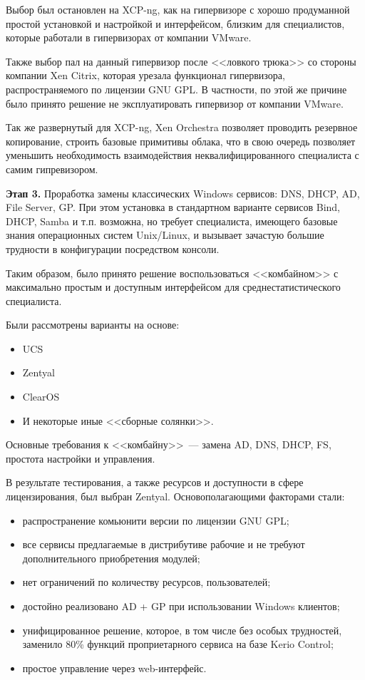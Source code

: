 \documentclass[10pt, a5paper]{article}
\begin{document}
Выбор был остановлен на XCP-ng, как на гипервизоре с хорошо продуманной простой установкой и настройкой и интерфейсом, близким для специалистов, которые работали в гипервизорах от компании VMware.

Также выбор пал на данный гипервизор после <<ловкого трюка>> со стороны компании Xen Citrix, которая урезала функционал гипервизора, распространяемого по лицензии GNU GPL. В частности, по этой же причине было принято решение не эксплуатировать гипервизор от компании VMware.

Так же развернутый для XCP-ng, Xen Orchestra позволяет проводить резервное копирование, строить базовые примитивы облака, что в свою очередь позволяет уменьшить необходимость взаимодействия неквалифицированного специалиста с самим гипревизором.

\textbf{Этап 3.} Проработка замены классических Windows сервисов:
DNS, DHCP, AD, File Server, GP. При этом установка в стандартном варианте сервисов Bind, DHCP, Samba и т.п. возможна, но требует специалиста, имеющего базовые знания операционных систем Unix/Linux, и вызывает зачастую большие трудности в конфигурации посредством консоли.

Таким образом, было принято решение воспользоваться <<комбайном>> с максимально простым и доступным интерфейсом для среднестатистического специалиста.

Были рассмотрены варианты на основе:

\begin{itemize}
  \item UCS
  \item Zentyal
  \item ClearOS
  \item И некоторые иные <<сборные солянки>>.
\end{itemize}

Основные требования к <<комбайну>>~--- замена AD, DNS, DHCP, FS, простота настройки и управления.

В результате тестирования, а также ресурсов и доступности в сфере лицензирования, был выбран Zentyal.
Основополагающими факторами стали:

\begin{itemize}
  \item распространение комьюнити версии по лицензии GNU GPL;
  \item все сервисы предлагаемые в дистрибутиве рабочие и не требуют дополнительного приобретения модулей;
  \item нет ограничений по количеству ресурсов, пользователей;
  \item достойно реализовано AD + GP при использовании Windows клиентов;
  \item унифицированное решение, которое, в том числе без особых трудностей, заменило 80\% функций проприетарного сервиса на базе Kerio Control;
  \item простое управление через web-интерфейс.
\end{itemize}
\end{document}
